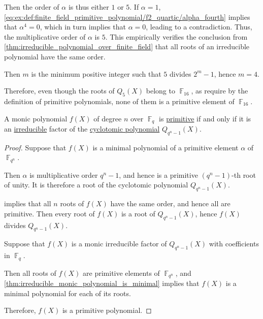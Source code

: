 \begin{example}
\begin{thmenum}
    Then the order of \( \alpha \) is thus either \( 1 \) or \( 5 \). If \( \alpha = 1 \), \eqref{eq:ex:def:finite_field_primitive_polynomial/f2_quartic/alpha_fourth} implies that \( \alpha^4 = 0 \), which in turn implies that \( \alpha = 0 \), leading to a contradiction. Thus, the multiplicative order of \( \alpha \) is \( 5 \). This empirically verifies the conclusion from \cref{thm:irreducible_polynomial_over_finite_field} that all roots of an irreducible polynomial have the same order.

    Then \( m \) is the minimum positive integer such that \( 5 \) divides \( 2^m - 1 \), hence \( m = 4 \).

    Therefore, even though the roots of \( Q_5(X) \) belong to \( \BbbF_{16} \), as require by the definition of primitive polynomials, none of them is a primitive element of \( \BbbF_{16} \).
  \end{thmenum}
\end{example}

\begin{proposition}\label{thm:primitive_polynomial_cyclotomic_factor}
  A monic polynomial \( f(X) \) of degree \( n \) over \( \BbbF_q \) is \hyperref[def:finite_field_primitive_polynomial]{primitive} if and only if it is an \hyperref[def:domain_divisibility/irreducible]{irreducible} factor of the \hyperref[def:cyclotomic_polynomial]{cyclotomic polynomial} \( Q_{q^n - 1}(X) \).
\end{proposition}
\begin{proof}
  \SufficiencySubProof Suppose that \( f(X) \) is a minimal polynomial of a primitive element \( \alpha \) of \( \BbbF_{q^n} \).

  Then \( \alpha \) is multiplicative order \( q^n - 1 \), and hence is a primitive \( (q^n - 1) \)-th root of unity. It is therefore a root of the cyclotomic polynomial \( Q_{q^n - 1}(X) \).

   implies that all \( n \) roots of \( f(X) \) have the same order, and hence all are primitive. Then every root of \( f(X) \) is a root of \( Q_{q^n - 1}(X) \), hence \( f(X) \) divides \( Q_{q^n - 1}(X) \).

  \NecessitySubProof Suppose that \( f(X) \) is a monic irreducible factor of \( Q_{q^n - 1}(X) \) with coefficients in \( \BbbF_q \).

  Then all roots of \( f(X) \) are primitive elements of \( \BbbF_{q^n} \), and \cref{thm:irreducible_monic_polynomial_is_minimal} implies that \( f(X) \) is a minimal polynomial for each of its roots.

  Therefore, \( f(X) \) is a primitive polynomial.
\end{proof}
